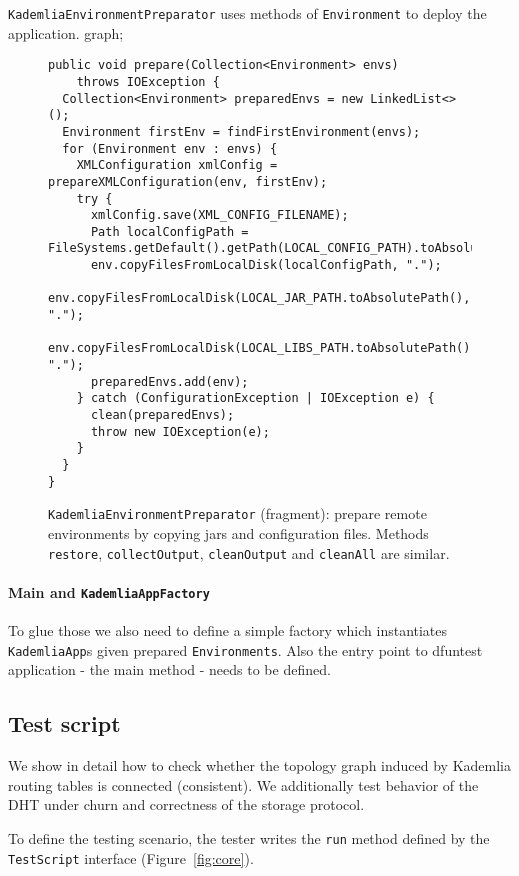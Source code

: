 \texttt{KademliaEnvironmentPreparator} uses methods of \texttt{Environment} to deploy the application.
graph;
\begin{figure}[tbp]
\begin{lstlisting}
public void prepare(Collection<Environment> envs)
    throws IOException {
  Collection<Environment> preparedEnvs = new LinkedList<>();
  Environment firstEnv = findFirstEnvironment(envs);
  for (Environment env : envs) {
    XMLConfiguration xmlConfig = prepareXMLConfiguration(env, firstEnv);
    try {
      xmlConfig.save(XML_CONFIG_FILENAME);
      Path localConfigPath = FileSystems.getDefault().getPath(LOCAL_CONFIG_PATH).toAbsolutePath();
      env.copyFilesFromLocalDisk(localConfigPath, ".");
      env.copyFilesFromLocalDisk(LOCAL_JAR_PATH.toAbsolutePath(), ".");
      env.copyFilesFromLocalDisk(LOCAL_LIBS_PATH.toAbsolutePath(), ".");
      preparedEnvs.add(env);
    } catch (ConfigurationException | IOException e) {
      clean(preparedEnvs);
      throw new IOException(e);
    }
  }
}
\end{lstlisting}
\caption{\texttt{KademliaEnvironmentPreparator} (fragment): prepare remote environments by copying jars and configuration files. Methods \texttt{restore}, \texttt{collectOutput}, \texttt{cleanOutput} and \texttt{cleanAll} are similar.}
\label{fig:prepare}
\end{figure}


\paragraph{Main and \texttt{KademliaAppFactory}} To glue those we also need to
define a simple factory which instantiates \texttt{KademliaApp}s given prepared
\texttt{Environments}. Also the entry point to dfuntest application - the main
method - needs to be defined.

\subsection{Test script}

We show in detail how to check whether the topology graph induced by Kademlia
routing tables is connected (consistent).
We additionally test behavior of the DHT under churn and correctness of the
storage protocol.

To define the testing scenario, the tester writes the \texttt{run} method defined by the
\texttt{TestScript} interface (Figure~\ref{fig:core}).

